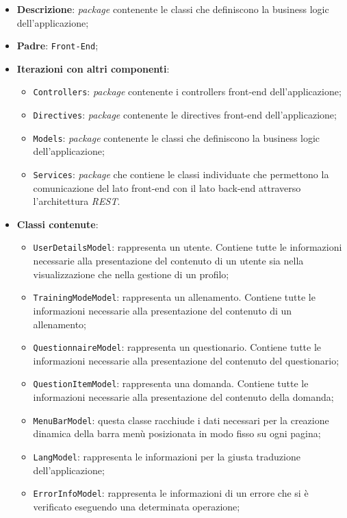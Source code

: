 		\begin{itemize}
			\item \textbf{Descrizione}: \textit{package} contenente le classi che definiscono la business logic dell'applicazione;
			\item \textbf{Padre}: \texttt{Front-End};
			\item \textbf{Iterazioni con altri componenti}: 
				\begin{itemize}				
					\item \texttt{Controllers}: \textit{package} contenente i controllers front-end dell'applicazione;
					\item \texttt{Directives}: \textit{package} contenente le directives front-end dell'applicazione;
					\item \texttt{Models}: \textit{package} contenente le classi che definiscono la business logic dell'applicazione;
					\item \texttt{Services}: \textit{package} che contiene le classi individuate che permettono la comunicazione del lato front-end con il lato back-end attraverso l'architettura \textit{REST}.
				\end{itemize}
			\item \textbf{Classi contenute}:
			\begin{itemize}
				\item \texttt{UserDetailsModel}: rappresenta un utente. Contiene tutte le informazioni necessarie alla presentazione del contenuto di un utente sia nella visualizzazione che nella gestione di un profilo;
				\item \texttt{TrainingModeModel}: rappresenta un allenamento. Contiene tutte le informazioni necessarie alla presentazione del contenuto di un allenamento;
				\item \texttt{QuestionnaireModel}: rappresenta un questionario. Contiene tutte le informazioni necessarie alla presentazione del contenuto del questionario;
				\item \texttt{QuestionItemModel}: rappresenta una domanda. Contiene tutte le informazioni necessarie alla presentazione del contenuto della domanda;
				\item \texttt{MenuBarModel}: questa classe racchiude i dati necessari per la creazione dinamica della barra menù posizionata in modo fisso su ogni pagina;
				\item \texttt{LangModel}: rappresenta le informazioni per la giusta traduzione dell'applicazione;
				\item \texttt{ErrorInfoModel}: rappresenta le informazioni di un errore che si è verificato eseguendo una determinata operazione;
			\end{itemize}
		\end{itemize}